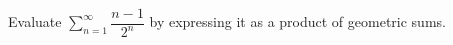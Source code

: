 Evaluate $\displaystyle\sum_{n=1}^{\infty}\dfrac{n-1}{2^n}$ by expressing it as a product of geometric sums.
